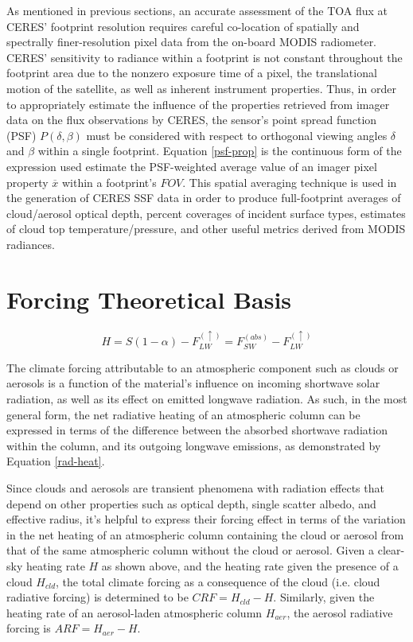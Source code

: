 \documentclass[12pt]{article}
\begin{document}
    As mentioned in previous sections, an accurate assessment of the TOA flux at CERES' footprint resolution requires careful co-location of spatially and spectrally finer-resolution pixel data from the on-board MODIS radiometer. CERES' sensitivity to radiance within a footprint is not constant throughout the footprint area due to the nonzero exposure time of a pixel, the translational motion of the satellite, as well as inherent instrument properties. Thus, in order to appropriately estimate the influence of the properties retrieved from imager data on the flux observations by CERES, the sensor's point spread function (PSF) $P(\delta,\beta)$ must be considered with respect to orthogonal viewing angles $\delta$ and $\beta$ within a single footprint. Equation \ref{psf-prop} is the continuous form of the expression used estimate the PSF-weighted average value of an imager pixel property $\overline{x}$ within a footprint's $FOV$. This spatial averaging technique is used in the generation of CERES SSF data in order to produce full-footprint averages of cloud/aerosol optical depth, percent coverages of incident surface types, estimates of cloud top temperature/pressure, and other useful metrics derived from MODIS radiances.

    \section{Forcing Theoretical Basis}

    \begin{equation}\label{rad-heat}
        H = S(1-\alpha) - F^{(\uparrow)}_{LW} = F^{(abs)}_{SW} - F^{(\uparrow)}_{LW}
    \end{equation}

    The climate forcing attributable to an atmospheric component such as clouds or aerosols is a function of the material's influence on incoming shortwave solar radiation, as well as its effect on emitted longwave radiation. As such, in the most general form, the net radiative heating of an atmospheric column can be expressed in terms of the difference between the absorbed shortwave radiation within the column, and its outgoing longwave emissions, as demonstrated by Equation \ref{rad-heat}.

    Since clouds and aerosols are transient phenomena with radiation effects that depend on other properties such as optical depth, single scatter albedo, and effective radius, it's helpful to express their forcing effect in terms of the variation in the net heating of an atmospheric column containing the cloud or aerosol from that of the same atmospheric column without the cloud or aerosol. Given a clear-sky heating rate $H$ as shown above, and the heating rate given the presence of a cloud $H_{cld}$, the total climate forcing as a consequence of the cloud (i.e. cloud radiative forcing) is determined to be $CRF = H_{cld} - H$. Similarly, given the heating rate of an aerosol-laden atmospheric column $H_{aer}$, the aerosol radiative forcing is $ARF = H_{aer} - H$.
\end{document}

